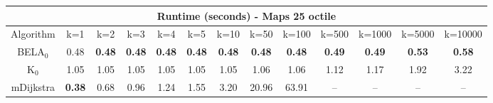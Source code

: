\begin{tabular}{c|cccccccccccc}\toprule
\multicolumn{13}{c}{Runtime (seconds) - Maps 25 octile}\\ \midrule
Algorithm & k=1 & k=2 & k=3 & k=4 & k=5 & k=10 & k=50 & k=100 & k=500 & k=1000 & k=5000 & k=10000 \\ \midrule
BELA$_0$ & 0.48 & \textbf{0.48} & \textbf{0.48} & \textbf{0.48} & \textbf{0.48} & \textbf{0.48} & \textbf{0.48} & \textbf{0.48} & \textbf{0.49} & \textbf{0.49} & \textbf{0.53} & \textbf{0.58} \\
K$_0$ & 1.05 & 1.05 & 1.05 & 1.05 & 1.05 & 1.05 & 1.06 & 1.06 & 1.12 & 1.17 & 1.92 & 3.22 \\
mDijkstra & \textbf{0.38} & 0.68 & 0.96 & 1.24 & 1.55 & 3.20 & 20.96 & 63.91 & -- & -- & -- & -- \\ \bottomrule 
\end{tabular}
